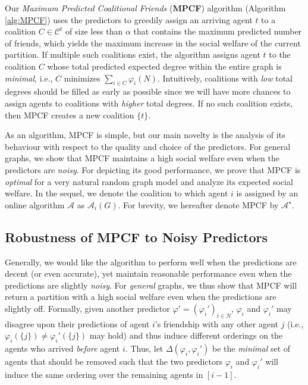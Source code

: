 \documentclass[letterpaper]{article} %
\begin{document}
Our \textit{Maximum Predicted Coalitional Friends} (\textbf{MPCF}) algorithm (Algorithm \ref{alg:MPCF}) uses the predictors to greedily assign an arriving agent $t$ to a coalition $C \in \mathcal{C}^t$ of size less than $\alpha$ that contains the maximum predicted number of friends, which yields the maximum increase in the social welfare of the current partition. If multiple such coalitions exist, the algorithm assigns agent $t$ to the coalition $C$ whose total predicted expected degree within the entire graph is \textit{minimal}, i.e., $C$ minimizes $\sum_{i \in C} \varphi_i(N)$. Intuitively, coalitions with \textit{low} total degrees should be filled as early as possible since we will have more chances to assign agents to coalitions with \textit{higher} total degrees. If no such coalition exists, then MPCF creates a new coalition $\{t\}$.

As an algorithm, MPCF is simple, but our main novelty is the analysis of its behaviour with respect to the quality and choice of the predictors. For general graphs, we show that MPCF maintains a high social welfare even when the predictors are \textit{noisy}. For depicting its good performance, we prove that MPCF is \textit{optimal} for a very natural random graph model and analyze its expected social welfare. In the sequel, we denote the coalition to which agent $i$ is assigned by an online algorithm $\mathcal{A}$ as $\mathcal{A}_i(G)$. %
For brevity, we hereafter denote MPCF by $\mathcal{A}^\star$.


\subsection{Robustness of MPCF to Noisy Predictors}
\label{sec:MPCF with Noisy Predictors}
Generally, we would like the algorithm to perform well when the predictions are decent (or even accurate), yet maintain reasonable performance even when the predictions are slightly \textit{noisy}. For \textit{general} graphs, we thus show that MPCF will return a partition with a high social welfare even when the predictions are slightly off. Formally, given another predictor $\varphi' = (\varphi_i')_{i \in N}$, $\varphi_i$ and $\varphi_i'$ may disagree upon their predictions of agent $i$'s friendship with any other agent $j$ (i.e., $\varphi_i(\{j\}) \neq \varphi_i'(\{j\})$ may hold) and thus induce different orderings on the agents who arrived \textit{before} agent $i$. Thus, let $\Delta(\varphi_i,\varphi_i')$ be the \textit{minimal} set of agents that should be removed such that the two predictors $\varphi_i$ and $\varphi_i'$ will induce the same ordering over the remaining agents in $[i-1]$.
\end{document}
